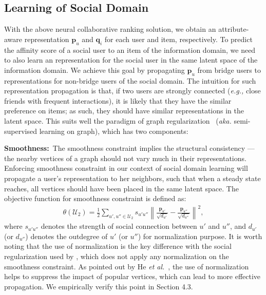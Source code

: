 \documentclass[sigconf]{acmart}
\newcommand\norm[1]{\left\lVert#1\right\rVert}
\newcommand{\Mat}[1]{\mathbf{#1}}
\newcommand{\Set}[1]{\mathcal{#1}}
\newcommand{\eg}{\emph{e.g., }}
\newcommand{\etal}{\emph{et al.}}
\newcommand{\aka}{\emph{aka. }}
\begin{document}
\subsection{Learning of Social Domain}

With the above neural collaborative ranking solution, we obtain an attribute-aware representation $\Mat{p}_u$ and $\Mat{q}_i$ for each user and item, respectively.
To predict the affinity score of a social user to an item of the information domain, we need to also learn an representation for the social user in the same latent space of the information domain. We achieve this goal by propagating $\Mat{p}_u$ from bridge users to representations for non-bridge users of the social domain. The intuition for such representation propagation is that, if two users are strongly connected (\eg close friends with frequent interactions), it is likely that they have the similar preference on items; as such, they should have similar representations in the latent space. This suits well the paradigm of graph regularization~\cite{DBLP:conf/cikm/HeCKC15,DBLP:journals/tkde/WangFHLW17,DBLP:journals/tkde/WangFHTW16,fuli2017computational} (\aka semi-supervised learning on graph), which has two components:






\textbf{Smoothness:}~The smoothness constraint implies the structural consistency --- the nearby vertices of a graph should not vary much in their representations. Enforcing smoothness constraint in our context of social domain learning will propagate a user's representation to her neighbors, such that when a steady state reaches, all vertices should have been placed in the same latent space. The objective function for smoothness constraint is defined as:
\begin{gather}\label{equ:smoothness}
\theta(\Set{U}_{2})=\frac{1}{2}\sum_{u',u''\in\Set{U}_{2}}s_{u'u''}\norm{\frac{\Mat{p}_{u'}}{\sqrt{d_{u'}}}-\frac{\Mat{p}_{u''}}{\sqrt{d_{u''}}}}^{2},
\end{gather}
where $s_{u'u''}$ denotes the strength of social connection between $u'$ and $u''$, and $d_{u'}$ (or $d_{u''}$) denotes the outdegree of $u'$ (or $u''$) for normalization purpose. It is worth noting that the use of normalization is the key difference with the social regularization used by \cite{DBLP:conf/wsdm/MaZLLK11,zhao2016user}, which does not apply any normalization on the smoothness constraint. As pointed out by He \etal~\cite{DBLP:conf/cikm/HeCKC15}, the use of normalization helps to suppress the impact of popular vertices, which can lead to more effective propagation. We empirically verify this point in Section 4.3.
\end{document}
